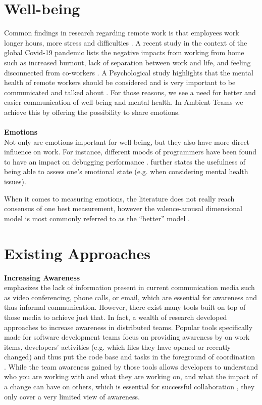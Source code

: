 \section{Well-being} 
Common findings in research regarding remote work is that employees work longer hours, more stress and difficulties \cite{mswellbeing, mulki2009set, qualtricksmental}. A recent study in the context of the global Covid-19 pandemic lists the negative impacts from working from home such as increased burnout, lack of separation between work and life, and feeling disconnected from co-workers \cite{mswellbeing}. A Psychological study highlights that the mental health of remote workers should be considered and is very important to be communicated and talked about \cite{grant2013exploration}. For those reasons, we see a need for better and easier communication of well-being and mental health. In Ambient Teams we achieve this by offering the possibility to share emotions.
\\\\
\textbf{Emotions} \\
Not only are emotions important for well-being, but they also have more direct influence on work. For instance, different moods of programmers have been found to have an impact on debugging performance \cite{khan2011moods}. \cite{mcduff2012affectaura} further states the usefulness of being able to assess one's emotional state (e.g. when considering mental health issues).

When it comes to measuring emotions, the literature does not really reach consensus of one best measurement, however the valence-arousal dimensional model is most commonly referred to as the ``better'' model \cite{russell1980circumplex, mauss2009measures}. 

\section{Existing Approaches}

\textbf{Increasing Awareness} \\
\cite{rocker2012informal} emphasizes the lack of information present in current communication media such as video conferencing, phone calls, or email, which are essential for awareness and thus informal communication. However, there exist many tools built on top of those media to achieve just that. In fact, a wealth of research developed approaches to increase awareness in distributed teams. Popular tools specifically made for software development teams focus on providing awareness by on work items, developers' activities (e.g. which files they have opened or recently changed) and thus put the code base and tasks in the foreground of coordination \cite{biehl2007fastdash, jakobsen2009wipdash, eick1992seesoft, deline2005easing}. While the team awareness gained by those tools allows developers to understand who you are working with and what they are working on, and what the impact of a change can have on others, which is essential for successful collaboration \cite{dourish1992awareness}, they only cover a very limited view of awareness.

